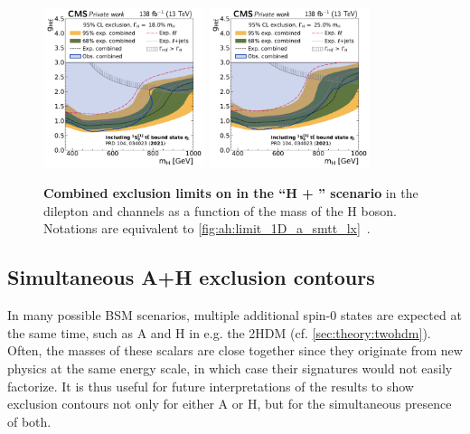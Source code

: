 \begin{figure}[!ph]
    \\
    \includegraphics[width=0.42\textwidth]{figures/ah/limits_combined/etat/H_limit_w18p0_g-scan.pdf}%
    \hspace*{0.05\textwidth}%
    \includegraphics[width=0.42\textwidth]{figures/ah/limits_combined/etat/H_limit_w25p0_g-scan.pdf}
    \caption{%
    \textbf{Combined exclusion limits on \gHtt in the ``H + \etat'' scenario} in the dilepton and \ljets channels as a function of the mass of the H boson. Notations are equivalent to \cref{fig:ah:limit_1D_a_smtt_lx}~\cite{CMS:HIG-22-013}.
    }
    \label{fig:ah:limit_1D_h_etat_lx}
\end{figure}

\subsection{Simultaneous A+H exclusion contours}

In many possible BSM scenarios, multiple additional spin-0 states are expected at the same time, such as A and H in e.g. the 2HDM (cf. \cref{sec:theory:twohdm}). Often, the masses of these scalars are close together since they originate from new physics at the same energy scale, in which case their signatures would not easily factorize. It is thus useful for future interpretations of the results to show exclusion contours not only for either A or H, but for the simultaneous presence of both.


